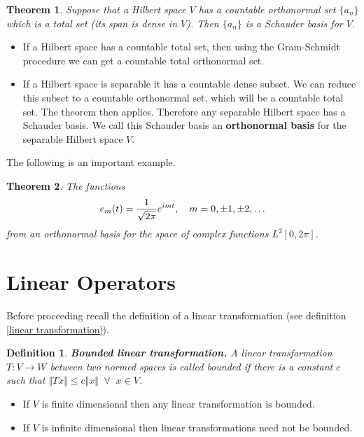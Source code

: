 \documentclass[two column]{article}
\newtheorem{theorem}{Theorem}[subsection]
\newtheorem{definition}{Definition}[subsection]
\begin{document}
\begin{theorem} \label{sch basis for H space}
Suppose that a Hilbert space $V$ has a countable orthonormal set $\{ a_{n} \}$ which is a total set (its span is dense in $V$). Then $\{ a_{n} \}$ is a Schauder basis for $V$. 
\end{theorem}
\begin{itemize}
\item If a Hilbert space has a countable total set, then using the Gram-Schmidt procedure we can get a countable total orthonormal set. 
\item If a Hilbert space is separable it has a countable dense subset. We can reduce this subset to a countable orthonormal set, which will be a countable total set. The theorem then applies. Therefore any separable Hilbert space has a Schauder basis. We call this Schauder basis an {\bf orthonormal basis} for the separable Hilbert space $V$. 
\end{itemize}

The following is an important example. \\

\begin{theorem}
The functions \vspace{-5pt}
\[
e_{m}(t) = \frac{1}{\sqrt{2\pi}}e^{imt}, \quad m = 0, \pm1, \pm2, \dots \vspace{-5pt}
\]
from an orthonormal basis for the space of complex functions $L^{2}[0,2\pi]$. \\
\end{theorem}

\section{Linear Operators}

Before proceeding recall the definition of a linear transformation (see definition \ref{linear transformation}). \\

\begin{definition}
{\bf Bounded linear transformation.} A linear transformation $T : V \rightarrow W$ between two normed spaces is called bounded if there is a constant $c$ such that $\Vert Tx \Vert \leq c \Vert x \Vert \;\; \forall \;\; x \in V$. 
\end{definition}
\begin{itemize}
\item If $V$ is finite dimensional then any linear transformation is bounded. 
\item If $V$ is infinite dimensional then linear transformations need not be bounded.\\
\end{itemize}
\end{document}
